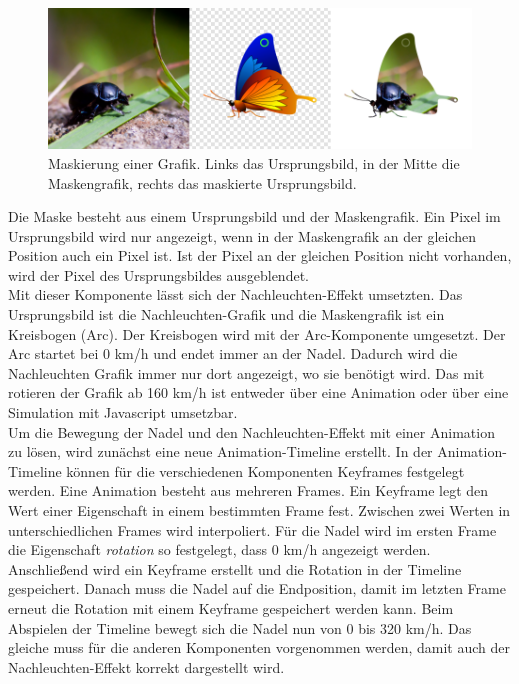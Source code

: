 \begin{figure}[htb]
	\centering
	\includegraphics[width=\textwidth]{img/4_hmi_tools/qt_mask}
	\caption[Maskierung einer Grafik in Qt]{Maskierung einer Grafik. Links das Ursprungsbild, in der Mitte die Maskengrafik, rechts das maskierte Ursprungsbild. \cite{qt_mask}}
	\label{fig:qt_mask}
\end{figure} 

Die Maske besteht aus einem Ursprungsbild und der Maskengrafik. Ein Pixel im Ursprungsbild wird nur angezeigt, wenn in der Maskengrafik an der gleichen Position auch ein Pixel ist. Ist der Pixel an der gleichen Position nicht vorhanden, wird der Pixel des Ursprungsbildes ausgeblendet.\\

Mit dieser Komponente lässt sich der Nachleuchten-Effekt umsetzten. Das Ursprungsbild ist die Nachleuchten-Grafik und die Maskengrafik ist ein Kreisbogen (Arc). Der Kreisbogen wird mit der Arc-Komponente umgesetzt. Der Arc startet bei 0 \si[per-mode=symbol]{\kilo\meter\per\hour} und endet immer an der Nadel. Dadurch wird die Nachleuchten Grafik immer nur dort angezeigt, wo sie benötigt wird. Das mit rotieren der Grafik ab 160 \si[per-mode=symbol]{\kilo\meter\per\hour} ist entweder über eine Animation oder über eine Simulation mit Javascript umsetzbar.\\

Um die Bewegung der Nadel und den Nachleuchten-Effekt mit einer Animation zu lösen, wird zunächst eine neue Animation-Timeline erstellt. In der Animation-Timeline können für die verschiedenen Komponenten Keyframes festgelegt werden. Eine Animation besteht aus mehreren Frames. Ein Keyframe legt den Wert einer Eigenschaft in einem bestimmten Frame fest. Zwischen zwei Werten in unterschiedlichen Frames wird interpoliert. Für die Nadel wird im ersten Frame die Eigenschaft \textit{rotation} so festgelegt, dass 0 \si[per-mode=symbol]{\kilo\meter\per\hour} angezeigt werden. Anschließend wird ein Keyframe erstellt und die Rotation in der Timeline gespeichert. Danach muss die Nadel auf die Endposition, damit im letzten Frame erneut die Rotation mit einem Keyframe gespeichert werden kann. Beim Abspielen der Timeline bewegt sich die Nadel nun von 0 bis 320 \si[per-mode=symbol]{\kilo\meter\per\hour}. Das gleiche muss für die anderen Komponenten vorgenommen werden, damit auch der Nachleuchten-Effekt korrekt dargestellt wird.\\

